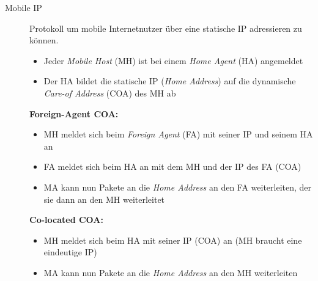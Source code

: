 \documentclass[a4paper]{article}
\begin{document}
\begin{description}
    \item[Mobile IP]
    \begin{samepage}
    Protokoll um mobile Internetnutzer über eine statische IP adressieren zu können.
    \begin{itemize}
        \item Jeder \textit{Mobile Host} (MH) ist bei einem \textit{Home Agent} (HA) angemeldet
        \item Der HA bildet die statische IP (\textit{Home Address}) auf die dynamische \textit{Care-of Address} (COA) des MH ab
    \end{itemize}
    \textbf{Foreign-Agent COA:}
    \begin{itemize}
        \item MH meldet sich beim \textit{Foreign Agent} (FA) mit seiner IP und seinem HA an
        \item FA meldet sich beim HA an mit dem MH und der IP des FA (COA)
        \item MA kann nun Pakete an die \textit{Home Address} an den FA weiterleiten, der sie dann an den MH weiterleitet
    \end{itemize}
    \textbf{Co-located COA:}
    \begin{itemize}
        \item MH meldet sich beim HA mit seiner IP (COA) an (MH braucht eine eindeutige IP)
        \item MA kann nun Pakete an die \textit{Home Address} an den MH weiterleiten
    \end{itemize}
    \end{samepage}
\end{description}
\end{document}
